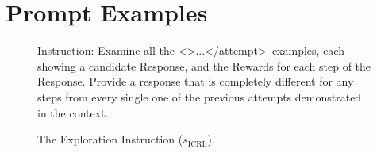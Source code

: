 \documentclass{article} %
\newcommand{\0}{\mathbf{0}}
\newcommand{\icrl}{\text{ICRL}}
\begin{document}



\section{Prompt Examples}
\label{sec prompt exp}


\begin{figure}[htbp]
  \centering
  \begin{tcolorbox}[
      colback=gray!5!white, 
      colframe=black!100!black, 
      width=1\textwidth
  ]
  \small
  
  Instruction: Examine all the \textless{}\textgreater ...\textless/attempt\textgreater\  examples, each showing a candidate Response, and the Rewards for each step of the Response. Provide a response that is completely different for any steps from every single one of the previous attempts demonstrated in the context.


  \end{tcolorbox}
  \caption{The Exploration Instruction ($s_\icrl$).}
  \label{fig:exploration_instruction}
\end{figure}
\end{document}
